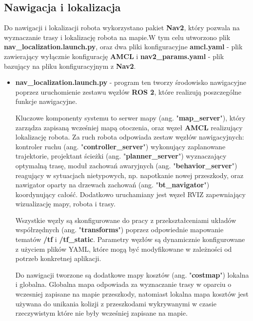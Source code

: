 \documentclass[a4paper,twoside,12pt]{book}
\begin{document}
\subsection{Nawigacja i lokalizacja}
Do nawigacji i lokalizacji robota wykorzystano pakiet \textbf{Nav2}, który pozwala na wyznaczanie trasy i lokalizację robota na mapie.\newline W tym celu utworzono plik \textbf{nav\_localization.launch.py}, oraz dwa pliki konfiguracyjne \textbf{amcl.yaml} - plik zawierający wyłącznie konfigurację \textbf{AMCL} i \textbf{nav2\_params.yaml} - plik bazujący na pliku konfiguracyjnym z \textbf{Nav2}.
\begin{itemize}
	\item \textbf{nav\_localization.launch.py} - program ten tworzy środowisko nawigacyjne poprzez uruchomienie zestawu węzłów \textbf{ROS 2}, które realizują poszczególne funkcje nawigacyjne.

	Kluczowe komponenty systemu to serwer mapy (ang. "\textbf{map\_server}"), który zarządza zapisaną wcześniej mapą otoczenia, oraz węzeł \textbf{AMCL} realizujący lokalizację robota. Za ruch robota odpowiada zestaw węzłów nawigacyjnych: kontroler ruchu (ang. "\textbf{controller\_server}") wykonujący zaplanowane trajektorie, projektant ścieżki (ang. "\textbf{planner\_server}") wyznaczający optymalną trasę, moduł zachowań awaryjnych (ang. "\textbf{behavior\_server}") reagujący w sytuacjach nietypowych, np. napotkanie nowej przeszkody, oraz nawigator oparty na drzewach zachowań (ang. "\textbf{bt\_navigator}") koordynujący całość.
\newpage
	 Dodatkowo uruchamiany jest węzeł RVIZ zapewniający wizualizację mapy, robota i trasy.

	Wszystkie węzły są skonfigurowane do pracy z przekształceniami układów współrzędnych (ang. "\textbf{transforms}") poprzez odpowiednie mapowanie tematów \newline \textbf{/tf} i \textbf{/tf\_static}. Parametry węzłów są dynamicznie konfigurowane z użyciem plików YAML, które mogą być modyfikowane w zależności od potrzeb konkretnej aplikacji.

	Do nawigacji tworzone są dodatkowe mapy kosztów (ang. "\textbf{costmap}") lokalna i globalna. Globalna mapa odpowiada za wyznaczanie trasy w oparciu o wczesniej zapisane na mapie przeszkody, natomiast lokalna mapa kosztów jest używana do unikania kolizji z przeszkodami wykrywanymi w czasie rzeczywistym które nie były wcześniej zapisane na mapie.	
	

\end{itemize}
\end{document}
